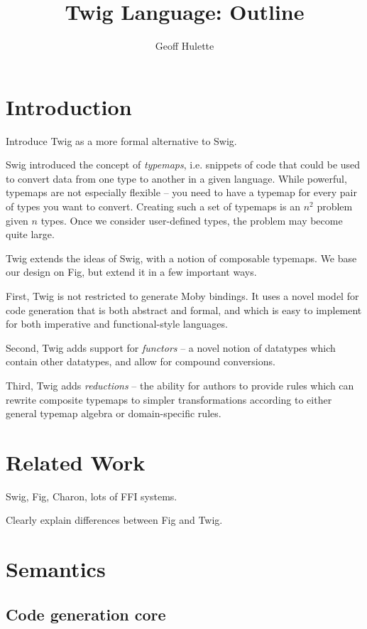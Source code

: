 \documentclass{article}
\begin{document}
\title{Twig Language: Outline}
\author{Geoff Hulette}

\maketitle

\section{Introduction}

Introduce Twig as a more formal alternative to Swig.

Swig introduced the concept of \emph{typemaps}, i.e. snippets of code that could
be used to convert data from one type to another in a given language. While
powerful, typemaps are not especially flexible -- you need to have a typemap for
every pair of types you want to convert. Creating such a set of typemaps is an
$n^2$ problem given $n$ types. Once we consider user-defined types, the problem
may become quite large.

Twig extends the ideas of Swig, with a notion of composable typemaps. We base
our design on Fig, but extend it in a few important ways.

First, Twig is not restricted to generate Moby bindings. It uses a novel model
for code generation that is both abstract and formal, and which is easy to
implement for both imperative and functional-style languages.

Second, Twig adds support for \emph{functors} -- a novel notion of datatypes
which contain other datatypes, and allow for compound conversions.

Third, Twig adds \emph{reductions} -- the ability for authors to provide rules
which can rewrite composite typemaps to simpler transformations according to
either general typemap algebra or domain-specific rules.

\section{Related Work}

Swig, Fig, Charon, lots of FFI systems. 

Clearly explain differences between Fig and Twig.


\section{Semantics}

\subsection{Code generation core}
\end{document}
